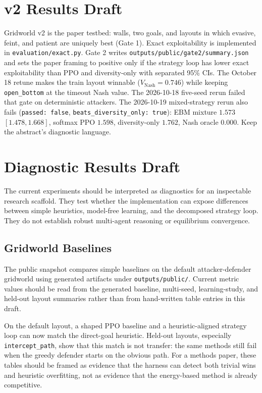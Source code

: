 \section{v2 Results Draft}

Gridworld v2 is the paper testbed: walls, two goals, and layouts in which evasive, feint, and patient are uniquely best (Gate 1).
Exact exploitability is implemented in \texttt{evaluation/exact.py}.
Gate 2 writes \texttt{outputs/public/gate2/summary.json} and sets the paper framing to positive only if the strategy loop has lower exact exploitability than PPO and diversity-only with separated 95\% CIs.
The October 18 retune makes the train layout winnable ($V_{\mathrm{Nash}}=0.746$) while keeping \texttt{open\_bottom} at the timeout Nash value.
The 2026-10-18 five-seed rerun failed that gate on deterministic attackers.
The 2026-10-19 mixed-strategy rerun also fails (\texttt{passed: false}, \texttt{beats\_diversity\_only: true}): EBM mixture $1.573$ $[1.478,1.668]$, softmax PPO $1.598$, diversity-only $1.762$, Nash oracle $0.000$.
Keep the abstract's diagnostic language.

\section{Diagnostic Results Draft}

The current experiments should be interpreted as diagnostics for an inspectable research scaffold.
They test whether the implementation can expose differences between simple heuristics, model-free learning, and the decomposed strategy loop.
They do not establish robust multi-agent reasoning or equilibrium convergence.

\subsection{Gridworld Baselines}

The public snapshot compares simple baselines on the default attacker-defender gridworld using generated artifacts under \texttt{outputs/public/}.
Current metric values should be read from the generated baseline, multi-seed, learning-study, and held-out layout summaries rather than from hand-written table entries in this draft.

On the default layout, a shaped PPO baseline and a heuristic-aligned strategy loop can now match the direct-goal heuristic.
Held-out layouts, especially \texttt{intercept\_path}, show that this match is not transfer: the same methods still fail when the greedy defender starts on the obvious path.
For a methods paper, these tables should be framed as evidence that the harness can detect both trivial wins and heuristic overfitting, not as evidence that the energy-based method is already competitive.

